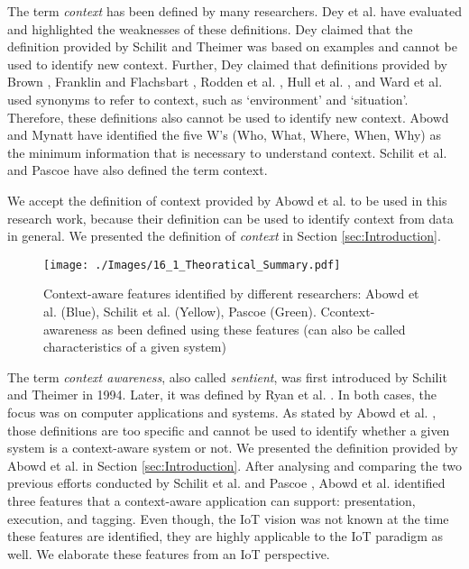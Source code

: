 \documentclass[journal]{IEEEtran}
\begin{document}
 The term \textit{context} has been defined by many researchers. Dey et al.  \cite{P143} have evaluated and highlighted  the weaknesses of these definitions.  Dey claimed  that the definition provided by Schilit and Theimer  \cite{P173} was based on examples and cannot be used to identify new context. Further, Dey claimed that definitions provided by Brown  \cite{P175}, Franklin and Flachsbart \cite{P178}, Rodden et al. \cite{P181}, Hull et al. \cite{P179}, and Ward et al. \cite{P183} used synonyms  to refer to context,  such as `environment'   and `situation'.  Therefore,  these definitions  also cannot be used to identify new context. Abowd and Mynatt  \cite{P115} have identified the five W's (Who, What, Where, When, Why) as the minimum  information that is necessary to understand context. Schilit et al.  \cite{P116} and Pascoe \cite{P180} have also defined the term context. 
 
 We accept the  definition of context provided by Abowd et al. \cite{P104} to be used  in this research  work, because  their definition can be used to identify context from data in general. We presented the definition of \textit{context} in Section \ref{sec:Introduction}.
 


 \begin{figure}[!b]
  \centering
\texttt{[image: ./Images/16\_1\_Theoratical\_Summary.pdf]}
\caption{Context-aware features identified by different researchers: Abowd et al.  \cite{P104} (Blue), Schilit et al.  \cite{P116} (Yellow), Pascoe \cite{P180} (Green). Ccontext-awareness as been defined using these features (can also be called characteristics of a given system) }
  \label{Figure:Theoratical_Summary}	
\end{figure}
 
 
 The term \textit{context awareness}, also called \textit{sentient}, was first introduced by Schilit and Theimer  \cite{P173}  in 1994. Later, it was defined  by Ryan et al.  \cite{P182}. In both cases, the focus was on computer applications and systems. As stated by Abowd et al.  \cite{P104}, those definitions  are too specific and cannot be used to identify whether a given system is a context-aware  system or not. We presented the definition provided by Abowd et al.  \cite{P104} in Section \ref{sec:Introduction}.  After analysing and comparing the two previous efforts conducted  by Schilit et al.  \cite{P116} and Pascoe \cite{P180}, Abowd et al. \cite{P104} identified three features that a context-aware  application  can support:  presentation,  execution, and tagging. Even though, the IoT vision was  not known at the time these  features  are identified,  they are highly applicable to the IoT paradigm  as well. We elaborate these features from an IoT perspective.
 
\end{document}
